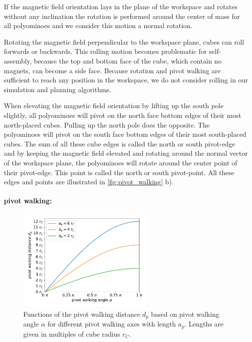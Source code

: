If the magnetic field orientation lays in the plane of the workspace and rotates without any inclination the rotation is performed around the center of mass for all polyominoes and we consider this motion a normal rotation.

Rotating the magnetic field perpendicular to the workspace plane, cubes can roll forwards or backwards.
This rolling motion becomes problematic for self-assembly, because the top and bottom face of the cube, which contain no magnets, can become a side face.
Because rotation and pivot walking are sufficient to reach any position in the workspace, we do not consider rolling in our simulation and planning algorithms.

When elevating the magnetic field orientation by lifting up the south pole slightly, all polyominoes will pivot on the north face bottom edges of their most north-placed cubes.
Pulling up the north pole does the opposite. The polyominoes will pivot on the south face bottom edges of their most south-placed cubes.
The sum of all these cube edges is called the north or south pivot-edge and by keeping the magnetic field elevated and rotating around the normal vector of the workspace plane, the polyominoes will rotate around the center point of their pivot-edge.
This point is called the north or south pivot-point.
All these edges and points are illustrated in \autoref{fig:pivot_walking} b).


\paragraph{pivot walking:}

\begin{figure}
	\centering
	\includegraphics[width=0.60\textwidth]{figures/plots/pivot_walking_angle.pdf}
	\caption[Functions of $d_p$ based on $\alpha$ for different $a_p$]{Functions of the pivot walking distance $d_p$ based on pivot walking angle $\alpha$ for different pivot walking axes with length $a_p$. Lengths are given in multiples of cube radius $r_C$.}
	\label{fig:pw_angle_plot}
\end{figure}

